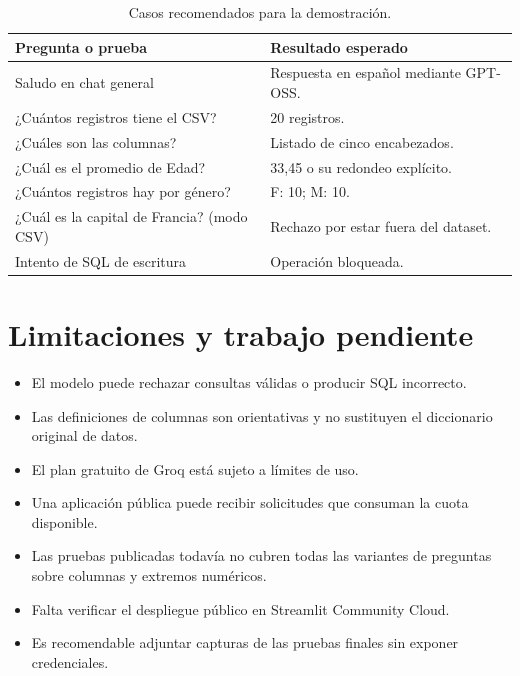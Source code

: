 \documentclass[11pt,a4paper]{article}
\begin{document}
\begin{table}[H]
\centering
\small
\caption{Casos recomendados para la demostración.}

\begin{tabularx}{\textwidth}{@{}p{5.3cm}X@{}}
\toprule
\textbf{Pregunta o prueba} &
\textbf{Resultado esperado}\\
\midrule

Saludo en chat general &
Respuesta en español mediante GPT-OSS.\\

¿Cuántos registros tiene el CSV? &
20 registros.\\

¿Cuáles son las columnas? &
Listado de cinco encabezados.\\

¿Cuál es el promedio de Edad? &
33,45 o su redondeo explícito.\\

¿Cuántos registros hay por género? &
F: 10; M: 10.\\

¿Cuál es la capital de Francia? (modo CSV) &
Rechazo por estar fuera del dataset.\\

Intento de SQL de escritura &
Operación bloqueada.\\

\bottomrule
\end{tabularx}
\end{table}

\section{Limitaciones y trabajo pendiente}

\begin{itemize}

\item El modelo puede rechazar consultas válidas
o producir SQL incorrecto.

\item Las definiciones de columnas son orientativas
y no sustituyen el diccionario original de datos.

\item El plan gratuito de Groq está sujeto
a límites de uso.

\item Una aplicación pública puede recibir solicitudes
que consuman la cuota disponible.

\item Las pruebas publicadas todavía no cubren
todas las variantes de preguntas sobre columnas
y extremos numéricos.

\item Falta verificar el despliegue público en
Streamlit Community Cloud.

\item Es recomendable adjuntar capturas de las
pruebas finales sin exponer credenciales.

\end{itemize}
\end{document}
